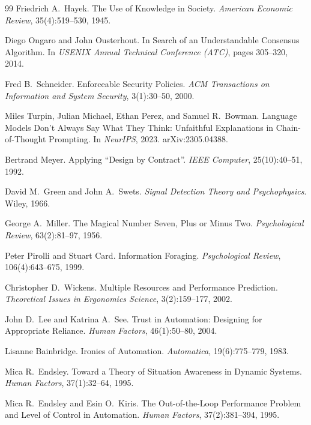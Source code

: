 \documentclass[11pt,a4paper]{article}
\theoremstyle{definition}
\theoremstyle{plain}
\begin{document}
\begin{thebibliography}{99}
Friedrich A.\ Hayek.
\newblock The Use of Knowledge in Society. \textit{American Economic Review}, 35(4):519--530, 1945.

Diego Ongaro and John Ousterhout.
\newblock In Search of an Understandable Consensus Algorithm.
\newblock In \textit{USENIX Annual Technical Conference (ATC)}, pages 305--320, 2014.

Fred B.\ Schneider.
\newblock Enforceable Security Policies.
\newblock \textit{ACM Transactions on Information and System Security}, 3(1):30--50, 2000.

Miles Turpin, Julian Michael, Ethan Perez, and Samuel R.\ Bowman.
\newblock Language Models Don't Always Say What They Think: Unfaithful Explanations in Chain-of-Thought Prompting.
\newblock In \textit{NeurIPS}, 2023. arXiv:2305.04388.

Bertrand Meyer.
\newblock Applying ``Design by Contract''.
\newblock \textit{IEEE Computer}, 25(10):40--51, 1992.

David M.\ Green and John A.\ Swets.
\newblock \textit{Signal Detection Theory and Psychophysics}. Wiley, 1966.

George A.\ Miller.
\newblock The Magical Number Seven, Plus or Minus Two.
\newblock \textit{Psychological Review}, 63(2):81--97, 1956.

Peter Pirolli and Stuart Card.
\newblock Information Foraging.
\newblock \textit{Psychological Review}, 106(4):643--675, 1999.

Christopher D.\ Wickens.
\newblock Multiple Resources and Performance Prediction.
\newblock \textit{Theoretical Issues in Ergonomics Science}, 3(2):159--177, 2002.

John D.\ Lee and Katrina A.\ See.
\newblock Trust in Automation: Designing for Appropriate Reliance.
\newblock \textit{Human Factors}, 46(1):50--80, 2004.

Lisanne Bainbridge.
\newblock Ironies of Automation.
\newblock \textit{Automatica}, 19(6):775--779, 1983.

Mica R.\ Endsley.
\newblock Toward a Theory of Situation Awareness in Dynamic Systems.
\newblock \textit{Human Factors}, 37(1):32--64, 1995.

Mica R.\ Endsley and Esin O.\ Kiris.
\newblock The Out-of-the-Loop Performance Problem and Level of Control in Automation.
\newblock \textit{Human Factors}, 37(2):381--394, 1995.


\end{thebibliography}
\end{document}

